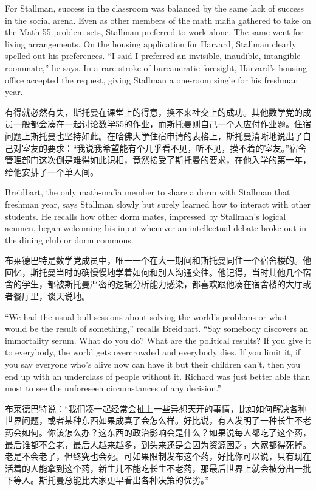 \ifdefined\eng
For Stallman, success in the classroom was balanced by the same lack of success in the social arena. Even as other members of the math mafia gathered to take on the Math 55 problem sets, Stallman preferred to work alone. The same went for living arrangements. On the housing application for Harvard, Stallman clearly spelled out his preferences. ``I said I preferred an invisible, inaudible, intangible roommate,'' he says. In a rare stroke of bureaucratic foresight, Harvard's housing office accepted the request, giving Stallman a one-room single for his freshman year.
\fi

\ifdefined\chs
有得就必然有失，斯托曼在课堂上的得意，换不来社交上的成功。其他数学党的成员一般都会凑在一起讨论数学55的作业，而斯托曼则自己一个人应付作业题。住宿问题上斯托曼也坚持如此。在哈佛大学住宿申请的表格上，斯托曼清晰地说出了自己对室友的要求：``我说我希望能有个几乎看不见，听不见，摸不着的室友。''宿舍管理部门这次倒是难得如此识相，竟然接受了斯托曼的要求，在他入学的第一年，给他安排了一个单人间。
\fi

\ifdefined\eng
Breidbart, the only math-mafia member to share a dorm with Stallman that freshman year, says Stallman slowly but surely learned how to interact with other students. He recalls how other dorm mates, impressed by Stallman's logical acumen, began welcoming his input whenever an intellectual debate broke out in the dining club or dorm commons.
\fi

\ifdefined\chs
布莱德巴特是数学党成员中，唯一一个在大一期间和斯托曼同住一个宿舍楼的。他回忆，斯托曼当时的确慢慢地学着如何和别人沟通交往。他记得，当时其他几个宿舍的学生，都被斯托曼严密的逻辑分析能力感染，都喜欢跟他凑在宿舍楼的大厅或者餐厅里，谈天说地。
\fi

\ifdefined\eng
``We had the usual bull sessions about solving the world's problems or what would be the result of something,'' recalls Breidbart. ``Say somebody discovers an immortality serum. What do you do? What are the political results? If you give it to everybody, the world gets overcrowded and everybody dies. If you limit it, if you say everyone who's alive now can have it but their children can't, then you end up with an underclass of people without it. Richard was just better able than most to see the unforeseen circumstances of any decision.''
\fi

\ifdefined\chs
布莱德巴特说：``我们凑一起经常会扯上一些异想天开的事情，比如如何解决各种世界问题，或者某种东西如果成真了会怎么样。好比说，有人发明了一种长生不老药会如何。你该怎么办？这东西的政治影响会是什么？如果说每人都吃了这个药，最后谁都不会老，最后人越来越多，到头来还是会因为资源困乏，大家都得死掉。老是不会老了，但终究也会死。可如果限制发布这个药，好比你可以说，只有现在活着的人能拿到这个药，新生儿不能吃长生不老药，那最后世界上就会被分出一批下等人。斯托曼总能比大家更早看出各种决策的优劣。''
\fi

